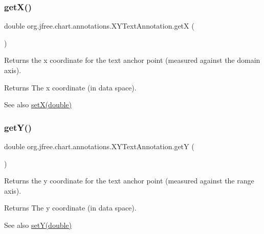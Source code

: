 \subsubsection{\texorpdfstring{get\+X()}{getX()}}
{\footnotesize\ttfamily double org.\+jfree.\+chart.\+annotations.\+X\+Y\+Text\+Annotation.\+getX (\begin{DoxyParamCaption}{ }\end{DoxyParamCaption})}

Returns the x coordinate for the text anchor point (measured against the domain axis).

\begin{DoxyReturn}{Returns}
The x coordinate (in data space).
\end{DoxyReturn}
\begin{DoxySeeAlso}{See also}
\mbox{\hyperlink{classorg_1_1jfree_1_1chart_1_1annotations_1_1_x_y_text_annotation_afba0bd9c1debbeb1870ffaa2679cde08}{set\+X(double)}} 
\end{DoxySeeAlso}
\mbox{\label{classorg_1_1jfree_1_1chart_1_1annotations_1_1_x_y_text_annotation_a8c0a7f769617443b23a36b7cdabc6860}} 
\subsubsection{\texorpdfstring{get\+Y()}{getY()}}
{\footnotesize\ttfamily double org.\+jfree.\+chart.\+annotations.\+X\+Y\+Text\+Annotation.\+getY (\begin{DoxyParamCaption}{ }\end{DoxyParamCaption})}

Returns the y coordinate for the text anchor point (measured against the range axis).

\begin{DoxyReturn}{Returns}
The y coordinate (in data space).
\end{DoxyReturn}
\begin{DoxySeeAlso}{See also}
\mbox{\hyperlink{classorg_1_1jfree_1_1chart_1_1annotations_1_1_x_y_text_annotation_a3d9a4cc0c33eed1ac5e9e9ebd7022c8c}{set\+Y(double)}} 
\end{DoxySeeAlso}
\mbox{\label{classorg_1_1jfree_1_1chart_1_1annotations_1_1_x_y_text_annotation_aa0303063248299081dba25ba9934985d}} 
